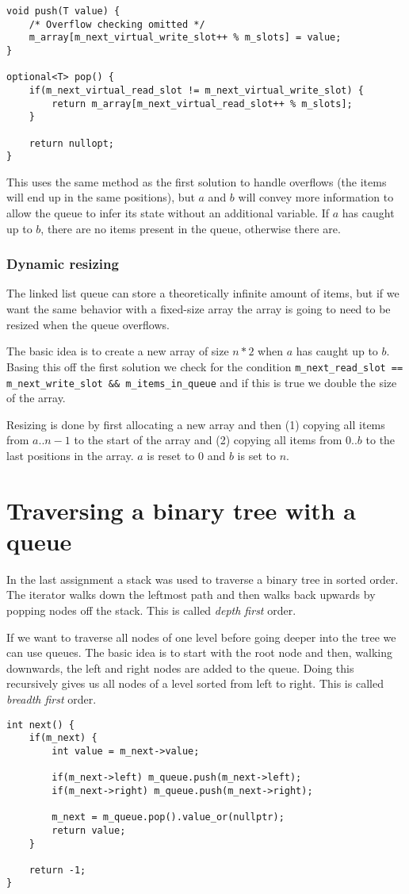 \documentclass[a4paper,11pt]{article}
\begin{document}
\begin{verbatim}
void push(T value) {
	/* Overflow checking omitted */
	m_array[m_next_virtual_write_slot++ % m_slots] = value;
}

optional<T> pop() {
	if(m_next_virtual_read_slot != m_next_virtual_write_slot) {
		return m_array[m_next_virtual_read_slot++ % m_slots];
	}

	return nullopt;
}
\end{verbatim}

This uses the same method as the first solution to handle overflows (the items will end up in the same positions), but $a$ and $b$ will convey more information to allow the queue to infer its state without an additional variable.
If $a$ has caught up to $b$, there are no items present in the queue, otherwise there are.

\subsubsection*{Dynamic resizing}

The linked list queue can store a theoretically infinite amount of items, but if we want the same behavior with a fixed-size array the array is going to need to be resized when the queue overflows.

The basic idea is to create a new array of size $n*2$ when $a$ has caught up to $b$.
Basing this off the first solution we check for the condition \texttt{m_next_read_slot == m_next_write_slot && m_items_in_queue} and if this is true we double the size of the array.

Resizing is done by first allocating a new array and then (1) copying all items from $a..n-1$ to the start of the array and (2) copying all items from $0..b$ to the last positions in the array.
$a$ is reset to $0$ and $b$ is set to $n$.

\section*{Traversing a binary tree with a queue}

In the last assignment a stack was used to traverse a binary tree in sorted order. The iterator walks down the leftmost path and then walks back upwards by popping nodes off the stack. This is called \emph{depth first} order.

If we want to traverse all nodes of one level before going deeper into the tree we can use queues. The basic idea is to start with the root node and then, walking downwards, the left and right nodes are added to the queue.
Doing this recursively gives us all nodes of a level sorted from left to right. This is called \emph{breadth first} order.

\begin{verbatim}
int next() {
	if(m_next) {
		int value = m_next->value;

		if(m_next->left) m_queue.push(m_next->left);
		if(m_next->right) m_queue.push(m_next->right);

		m_next = m_queue.pop().value_or(nullptr);
		return value;
	}

	return -1;
}
\end{verbatim}
\end{document}
